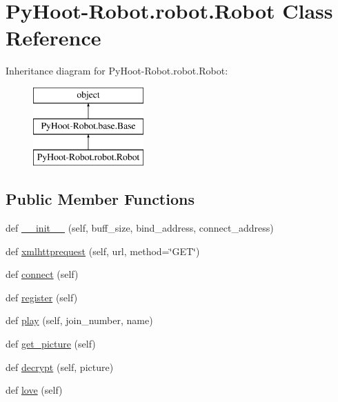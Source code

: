 \hypertarget{class_py_hoot-_robot_1_1robot_1_1_robot}{}\section{Py\+Hoot-\/\+Robot.robot.\+Robot Class Reference}
\label{class_py_hoot-_robot_1_1robot_1_1_robot}
Inheritance diagram for Py\+Hoot-\/\+Robot.robot.\+Robot\+:\begin{figure}[H]
\begin{center}
\leavevmode
\includegraphics[height=3.000000cm]{d2/db4/class_py_hoot-_robot_1_1robot_1_1_robot}
\end{center}
\end{figure}
\subsection*{Public Member Functions}
\begin{DoxyCompactItemize}
\item 
def \hyperlink{class_py_hoot-_robot_1_1robot_1_1_robot_a4edb7396f3c4fe7ad9ebcc16f266f85e}{\+\_\+\+\_\+init\+\_\+\+\_\+} (self, buff\+\_\+size, bind\+\_\+address, connect\+\_\+address)
\item 
def \hyperlink{class_py_hoot-_robot_1_1robot_1_1_robot_a37850158bb7394027449bfc6f07d493f}{xmlhttprequest} (self, url, method=\char`\"{}G\+ET\char`\"{})
\item 
def \hyperlink{class_py_hoot-_robot_1_1robot_1_1_robot_a833180eff5a9742a1fa7c14f195f931d}{connect} (self)
\item 
def \hyperlink{class_py_hoot-_robot_1_1robot_1_1_robot_afd3836c505bdb940bfd02e10d67df44d}{register} (self)
\item 
def \hyperlink{class_py_hoot-_robot_1_1robot_1_1_robot_a0001bc405e398066b5564c285480f1d9}{play} (self, join\+\_\+number, name)
\item 
def \hyperlink{class_py_hoot-_robot_1_1robot_1_1_robot_a04c483af242edbf980b28cf758a8ce35}{get\+\_\+picture} (self)
\item 
def \hyperlink{class_py_hoot-_robot_1_1robot_1_1_robot_ae2a9fb148958a87b595aef8d58b1feb6}{decrypt} (self, picture)
\item 
def \hyperlink{class_py_hoot-_robot_1_1robot_1_1_robot_afafad3dde3fdf4f9cb34d3c21495f627}{love} (self)
\end{DoxyCompactItemize}
